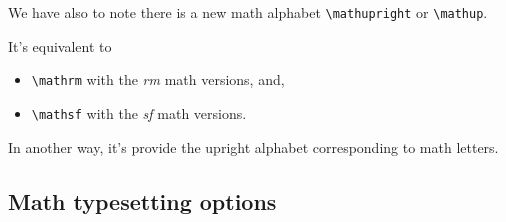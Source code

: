 \documentclass[a4paper,11pt]{article}
\begin{document}
\begin{center}
\end{center}

We have also to note there is a new math alphabet \verb=\mathupright= or \verb=\mathup=. 

It's equivalent to 
\begin{itemize}
	\item \verb=\mathrm= with the \textit{rm} math versions, and,
	\item \verb=\mathsf= with the \textit{sf} math versions.
\end{itemize}

 In another way, it's provide the upright alphabet corresponding to math letters.

\subsection{Math typesetting options}
\end{document}
